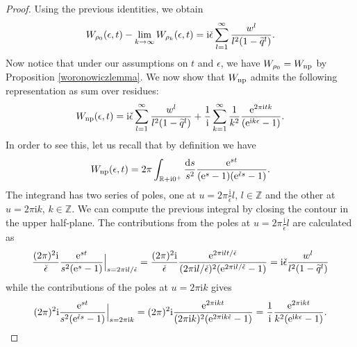 \documentclass[pdftex]{sigma}
\numberwithin{equation}{section}
\begin{document}
\begin{proof}
Using the previous identities, we obtain
\begin{equation*}
 W_{\rho_0}(\epsilon,t)-\lim_{k\to \infty}W_{\rho_k}(\epsilon,t)={\rm i}\check\epsilon\sum_{l=1}^\infty\frac{w^l}{l^2(1-\widetilde{q}^l)}.
\end{equation*}
Now notice that under our assumptions on $t$ and $\epsilon$, we have $W_{\rho_0}=W_{{\rm np}}$ by Proposition \ref{woronowiczlemma}. We now show that $W_{{\rm np}}$ admits the following representation as sum over residues:
\begin{equation*}
 W_{{\rm np}}(\epsilon,t)=\mathrm{i}\check\epsilon\sum_{l=1}^\infty\frac{w^l}{l^2(1-\widetilde{q}^l)}
 +\frac{1}{\mathrm{i}} \sum_{k=1}^{\infty} \frac{1}{k^2} \frac{{\rm e}^{2\pi \mathrm{i} t k}}{({\rm e}^{\mathrm{i} k \epsilon}-1)}.
\end{equation*}
In order to see this, let us recall that by definition we have
\begin{align*}
W_{\rm np}(\epsilon,t) =2\pi \int_{\mathbb{R}+\mathrm i0^+} \frac{{\rm d}s}{s^2}\frac{{\rm e}^{s t}}{({\rm e}^s-1)({\rm e}^{\check{\epsilon}s}-1)}.
\end{align*}
The integrand has two series of poles, one
at $u=2\pi\frac{\mathrm i}{\check\epsilon}l$, $l\in \mathbb{Z}$ and the other at
$u=2\pi \mathrm i k$, $k\in \mathbb{Z}$. We can compute the previous integral by closing the contour in the upper
half-plane. The contributions from the poles at $u=2\pi\frac{\mathrm i}{\check\epsilon}l$ are calculated as
\[
\begin{aligned}
\frac{(2\pi)^2 \mathrm i}{\check{\epsilon}}\frac{{\rm e}^{st}}{s^2({\rm e}^s-1)}\Big|_{s=2\pi \mathrm{i} l/{\check\epsilon}} =\frac{(2\pi)^2 \mathrm i}{\check{\epsilon}}\frac{{\rm e}^{2\pi {\rm i}l t/\check\epsilon}}{(2\pi \mathrm{i} l/\check\epsilon)^2({\rm e}^{2\pi \mathrm{i} l/\check\epsilon}-1)}
=\mathrm{i}\check{\epsilon}\frac{w^l}{l^2(1-\widetilde{q}^l)}
\end{aligned}
\]
while the contributions of the poles at $u=2\pi \mathrm i k$ gives
\begin{equation*}
 (2\pi)^2\mathrm{i}\frac{{\rm e}^{st}}{s^2({\rm e}^{\check\epsilon s}-1)}\Big|_{s=2\pi \mathrm{i} k} =(2\pi)^2 \mathrm i\frac{{\rm e}^{2\pi \mathrm{i} k t}}{(2\pi \mathrm{i} k)^2({\rm e}^{2\pi \mathrm{i} k\check\epsilon}-1)}
=\frac{1}{\mathrm{i}}\frac{{\rm e}^{2\pi \mathrm{i} k t}}{k^2({\rm e}^{ \mathrm{i} k\epsilon}-1)}.
\end{equation*}


\end{proof}
\end{document}
